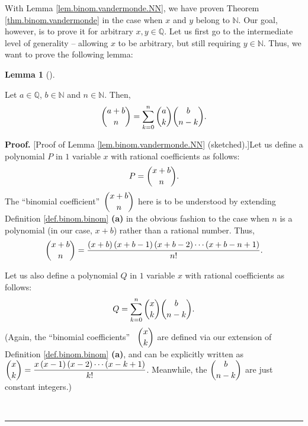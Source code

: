 \documentclass[numbers=enddot,12pt,final,onecolumn,notitlepage]{scrartcl}%
\numberwithin{exer}{subsection}
\theoremstyle{definition}
\newtheorem{lem}[theo]{Lemma}
\newenvironment{lemma}[1][]
{\begin{lem}[#1]\begin{leftbar}}
{\end{leftbar}\end{lem}}
\newenvironment{proof}[1][Proof]{\noindent\textbf{#1.} }{\ \rule{0.5em}{0.5em}}
\let\sumnonlimits\sum
\renewcommand{\sum}{\sumnonlimits\limits}
\begin{document}
With Lemma \ref{lem.binom.vandermonde.NN}, we have proven Theorem
\ref{thm.binom.vandermonde} in the case when $x$ and $y$ belong to
$\mathbb{N}$. Our goal, however, is to prove it for arbitrary $x,y\in
\mathbb{Q}$. Let us first go to the intermediate level of generality --
allowing $x$ to be arbitrary, but still requiring $y\in\mathbb{N}$. Thus, we
want to prove the following lemma:

\begin{lemma}
\label{lem.binom.vandermonde.QN}Let $a\in\mathbb{Q}$, $b\in\mathbb{N}$ and
$n\in\mathbb{N}$. Then,%
\[
\dbinom{a+b}{n}=\sum_{k=0}^{n}\dbinom{a}{k}\dbinom{b}{n-k}.
\]

\end{lemma}

\begin{proof}
[Proof of Lemma \ref{lem.binom.vandermonde.NN} (sketched).]Let us define a
polynomial $P$ in $1$ variable $x$ with rational coefficients as follows:%
\begin{equation}
P=\dbinom{x+b}{n}. \label{pf.lem.binom.vandermonde.NN.P=}%
\end{equation}
The \textquotedblleft binomial coefficient\textquotedblright\ $\dbinom{x+b}%
{n}$ here is to be understood by extending Definition \ref{def.binom.binom}
\textbf{(a)} in the obvious fashion to the case when $n$ is a polynomial (in
our case, $x+b$) rather than a rational number. Thus,%
\[
\dbinom{x+b}{n}=\dfrac{\left(  x+b\right)  \left(  x+b-1\right)  \left(
x+b-2\right)  \cdots\left(  x+b-n+1\right)  }{n!}.
\]


Let us also define a polynomial $Q$ in $1$ variable $x$ with rational
coefficients as follows:%
\begin{equation}
Q=\sum_{k=0}^{n}\dbinom{x}{k}\dbinom{b}{n-k}.
\label{pf.lem.binom.vandermonde.NN.Q=}%
\end{equation}
(Again, the \textquotedblleft binomial coefficients\textquotedblright%
\ $\dbinom{x}{k}$ are defined via our extension of Definition
\ref{def.binom.binom} \textbf{(a)}, and can be explicitly written as
$\dbinom{x}{k}=\dfrac{x\left(  x-1\right)  \left(  x-2\right)  \cdots\left(
x-k+1\right)  }{k!}$. Meanwhile, the $\dbinom{b}{n-k}$ are just constant integers.)


\end{proof}
\end{document}

